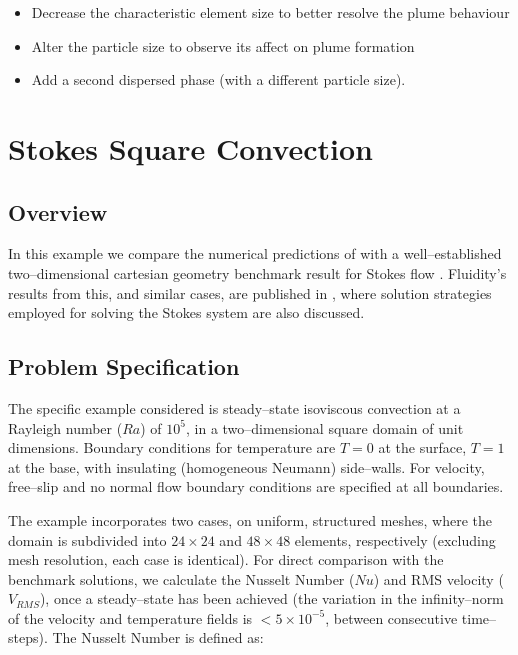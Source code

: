 \begin{itemize}
\item Decrease the characteristic element size to better resolve the plume behaviour
\item Alter the particle size to observe its affect on plume formation
\item Add a second dispersed phase (with a different particle size).
\end{itemize}


\section{Stokes Square Convection}
\label{sec:stokes_square_convection}

\subsection{Overview}

In this example we compare the numerical predictions of \fluidity{} with a well--established two--dimensional cartesian geometry benchmark result for Stokes flow \citep{blankenbach1989}. Fluidity's results from this, and similar cases, are published in \citet{Davies2011}, where solution strategies employed for solving the Stokes system are also discussed. 


\subsection{Problem Specification}

The specific example considered is steady--state isoviscous convection at a Rayleigh number ($Ra$) of $10^{5}$, in a two--dimensional square domain of unit dimensions. Boundary conditions for temperature are $T=0$ at the surface, $T=1$ at the base, with insulating (homogeneous Neumann) side--walls. For velocity, free--slip and no normal flow boundary conditions are specified at all boundaries. 

The example incorporates two cases, on uniform, structured meshes, where the domain is subdivided into $24 \times 24$ and $48 \times 48$ elements, respectively (excluding mesh resolution, each case is identical). For direct comparison with the benchmark solutions, we calculate the Nusselt Number ($Nu$) and RMS velocity ($V_{RMS}$), once a steady--state has been achieved (the variation in the infinity--norm of the velocity and temperature fields is $< 5 \times 10^{-5}$, between consecutive time--steps). The Nusselt Number is defined as:

